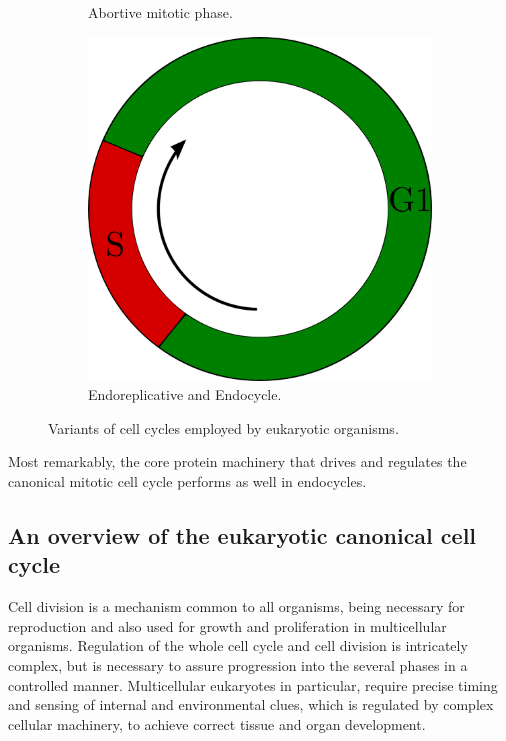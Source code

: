 \documentclass[11pt,twoside,a4paper]{report}
\begin{document}
\begin{figure}[here]
\begin{subfigure}{.33\textwidth}
				\caption{Abortive mitotic phase.}
			\end{subfigure}%
			\begin{subfigure}{.33\textwidth}
				\centering
				\includegraphics[width=0.95\linewidth]{pngs/endocycle.png}
				\caption{Endoreplicative and Endocycle.}
			\end{subfigure}%
			\caption{Variants of cell cycles employed by eukaryotic organisms.}
			\label{fig:simple_cell_cycle}
		\end{figure}
		
		
		Most remarkably, the core protein machinery that drives and regulates the canonical mitotic cell cycle performs as well in endocycles.
		
			\subsection{An overview of the eukaryotic canonical cell cycle}
			Cell division is a mechanism common to all organisms, being necessary for reproduction and also used for growth and proliferation in multicellular organisms. Regulation of the whole cell cycle and cell division is intricately complex, but is necessary to assure progression into the several phases in a controlled manner. Multicellular eukaryotes in particular, require precise timing and sensing of internal and environmental clues, which is regulated by complex cellular machinery, to achieve correct tissue and organ development.
			
\end{document}
